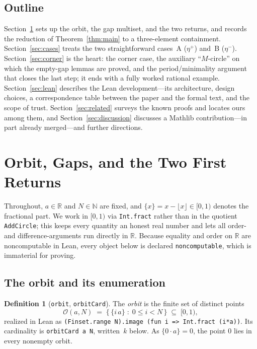 \documentclass[11pt,reqno]{amsart}
\theoremstyle{plain}
\theoremstyle{definition}
\newtheorem{definition}[theorem]{Definition}
\theoremstyle{remark}
\newcommand{\R}{\mathbb{R}}
\newcommand{\N}{\mathbb{N}}
\newcommand{\fract}[1]{\{#1\}}
\newcommand{\etap}{\eta^{+}}
\newcommand{\etam}{\eta^{-}}
\newcommand{\orb}{\mathcal{O}}
\newcommand{\code}[1]{\texttt{#1}}
\begin{document}
\subsection*{Outline}
Section~\ref{sec:setup} sets up the orbit, the gap multiset, and the two
returns, and records the reduction of Theorem~\ref{thm:main} to a
three-element containment.  Section~\ref{sec:cases} treats the two
straightforward cases~A ($\etap$) and~B ($\etam$).
Section~\ref{sec:corner} is the heart: the corner case, the auxiliary
``$M$-circle'' on which the empty-gap lemmas are proved, and the
period/minimality argument that closes the last step; it ends with a fully
worked rational example.  Section~\ref{sec:lean} describes the Lean
development---its architecture, design choices, a correspondence table between
the paper and the formal text, and the scope of trust.
Section~\ref{sec:related} surveys the known proofs and locates ours among
them, and Section~\ref{sec:discussion} discusses a Mathlib
contribution---in part already merged---and further directions.

\section{Orbit, Gaps, and the Two First Returns}\label{sec:setup}

Throughout, $a\in\R$ and $N\in\N$ are fixed, and $\fract{x}=x-\lfloor x\rfloor
\in[0,1)$ denotes the fractional part.  We work in $[0,1)$ via \code{Int.fract}
rather than in the quotient \code{AddCircle}; this keeps every quantity an
honest real number and lets all order- and difference-arguments run directly in
$\R$.  Because equality and order on $\R$ are noncomputable in Lean, every
object below is declared \code{noncomputable}, which is immaterial for proving.

\subsection{The orbit and its enumeration}

\begin{definition}[\code{orbit}, \code{orbitCard}]
The \emph{orbit} is the finite set of distinct points
\[
  \orb(a,N) \;=\; \bigl\{\, \fract{i\,a} \;:\; 0 \le i < N \,\bigr\}
  \;\subseteq\; [0,1),
\]
realized in Lean as \code{(Finset.range N).image (fun i => Int.fract (i*a))}.
Its cardinality is \code{orbitCard a N}, written~$k$ below.  As $\fract{0\cdot
a}=0$, the point $0$ lies in every nonempty orbit.
\end{definition}
\end{document}
